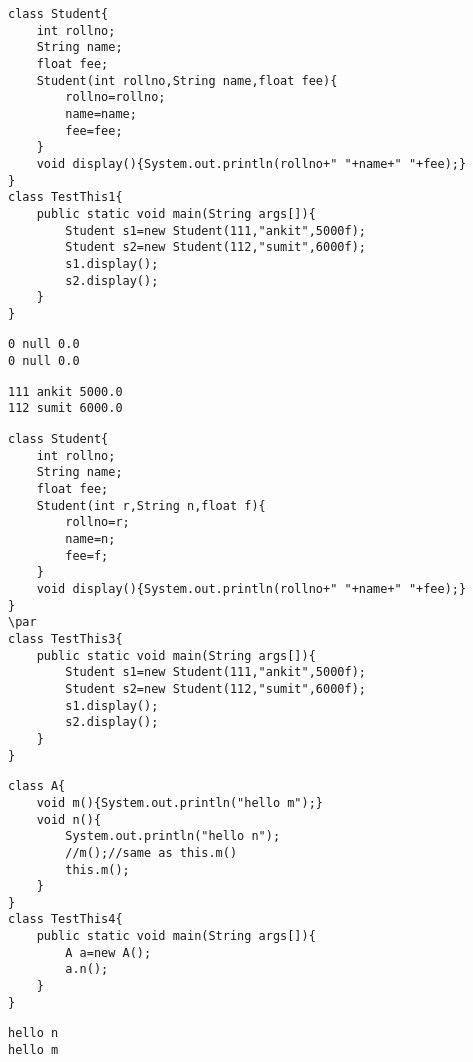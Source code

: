 \documentclass{book}
\def\lthtmlcheckvsize{\ifdim\ht\sizebox<\vsize 
  \ifdim\wd\sizebox<\hsize\expandafter\hfill\fi \expandafter\vfill
  \else\expandafter\vss\fi}%
\begin{document}
{\newpage\clearpage
{}%
\begin{lstlisting}
class Student{  
	int rollno;  
	String name;  
	float fee;  
	Student(int rollno,String name,float fee){  
		rollno=rollno;  
		name=name;  
		fee=fee;  
	}  
	void display(){System.out.println(rollno+" "+name+" "+fee);}  
}  
class TestThis1{  
	public static void main(String args[]){  
		Student s1=new Student(111,"ankit",5000f);  
		Student s2=new Student(112,"sumit",6000f);  
		s1.display();  
		s2.display();  
	}
} 
\end{lstlisting}%
\lthtmlfigureZ
\lthtmlcheckvsize\clearpage}

{\newpage\clearpage
{}%
\begin{lstlisting}
0 null 0.0
0 null 0.0
\end{lstlisting}%
\lthtmlfigureZ
\lthtmlcheckvsize\clearpage}

{\newpage\clearpage
{}%
\begin{lstlisting}
111 ankit 5000.0
112 sumit 6000.0
\end{lstlisting}%
\lthtmlfigureZ
\lthtmlcheckvsize\clearpage}

{\newpage\clearpage
{}%
\begin{lstlisting}
class Student{  
	int rollno;  
	String name;  
	float fee;  
	Student(int r,String n,float f){  
		rollno=r;  
		name=n;  
		fee=f;  
	}  
	void display(){System.out.println(rollno+" "+name+" "+fee);}  
}  
\par
class TestThis3{  
	public static void main(String args[]){  
		Student s1=new Student(111,"ankit",5000f);  
		Student s2=new Student(112,"sumit",6000f);  
		s1.display();  
		s2.display();  
	}
}  
\end{lstlisting}%
\lthtmlfigureZ
\lthtmlcheckvsize\clearpage}

{\newpage\clearpage
{}%
\begin{lstlisting}
class A{  
	void m(){System.out.println("hello m");}  
	void n(){  
		System.out.println("hello n");  
		//m();//same as this.m()  
		this.m();  
	}  
}  
class TestThis4{  
	public static void main(String args[]){  
		A a=new A();  
		a.n();  
	}
}  
\end{lstlisting}%
\lthtmlfigureZ
\lthtmlcheckvsize\clearpage}

{\newpage\clearpage
{}%
\begin{lstlisting}
hello n
hello m
\end{lstlisting}%
\lthtmlfigureZ
\lthtmlcheckvsize\clearpage}
\end{document}
